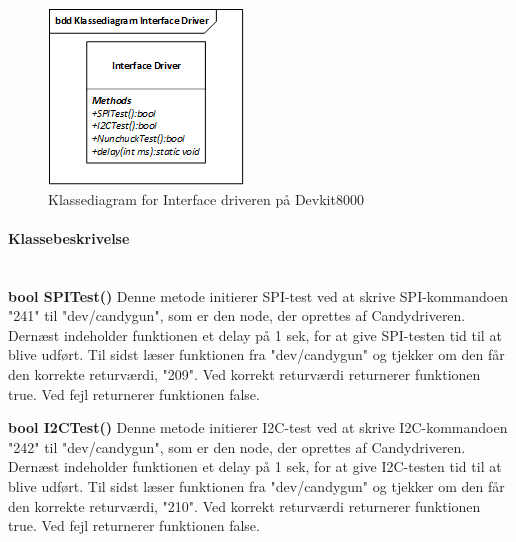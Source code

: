 \begin{figure}[H]
	\centering
	\includegraphics[width=\textwidth]{DesignOgImplementering/images/InterfacedriverKlassediagram}
	\caption{Klassediagram for Interface driveren på Devkit8000}
	\label{fig:InterfacedriverKlassediagram}
\end{figure}

\paragraph{Klassebeskrivelse} \mbox{} \\

\textbf{bool SPITest()}
Denne metode initierer SPI-test ved at skrive SPI-kommandoen "241" til "dev/candygun", som er den node, der oprettes af Candydriveren. Dernæst indeholder funktionen et delay på 1 sek, for at give SPI-testen tid til at blive udført. Til sidst læser funktionen fra "dev/candygun" og tjekker om den får den korrekte returværdi, "209". Ved korrekt returværdi returnerer funktionen true. Ved fejl returnerer funktionen false.      

\textbf{bool I2CTest()}
Denne metode initierer I2C-test ved at skrive I2C-kommandoen "242" til "dev/candygun", som er den node, der oprettes af Candydriveren. Dernæst indeholder funktionen et delay på 1 sek, for at give I2C-testen tid til at blive udført. Til sidst læser funktionen fra "dev/candygun" og tjekker om den får den korrekte returværdi, "210". Ved korrekt returværdi returnerer funktionen true. Ved fejl returnerer funktionen false.

